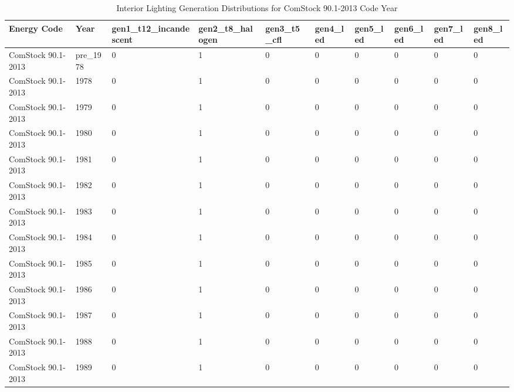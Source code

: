 \begin{table}
\scriptsize
\centering
\caption{Interior Lighting Generation Distributions for ComStock 90.1-2013 Code Year}
\label{tab:ltg_gen_tsv}
\begin{tabular}{|l|l|l|l|l|l|l|l|l|l|}
\hline
\textbf{Energy Code}        & \textbf{Yea}r      & \textbf{gen1\_t12\_incandescent} & \textbf{gen2\_t8\_halogen} & \textbf{gen3\_t5\_cfl} & \textbf{gen4\_led} & \textbf{gen5\_led} & \textbf{gen6\_led} & \textbf{gen7\_led} & \textbf{gen8\_led} \\ \hline
ComStock 90.1-2013 & pre\_1978 & 0 & 1     & 0     & 0         & 0        & 0        & 0        & 0        \\ \hline
ComStock 90.1-2013 & 1978      & 0 & 1     & 0     & 0         & 0        & 0        & 0        & 0        \\ \hline
ComStock 90.1-2013 & 1979      & 0 & 1     & 0     & 0         & 0        & 0        & 0        & 0        \\ \hline
ComStock 90.1-2013 & 1980      & 0 & 1     & 0     & 0         & 0        & 0        & 0        & 0        \\ \hline
ComStock 90.1-2013 & 1981      & 0 & 1     & 0     & 0         & 0        & 0        & 0        & 0        \\ \hline
ComStock 90.1-2013 & 1982      & 0 & 1     & 0     & 0         & 0        & 0        & 0        & 0        \\ \hline
ComStock 90.1-2013 & 1983      & 0 & 1     & 0     & 0         & 0        & 0        & 0        & 0        \\ \hline
ComStock 90.1-2013 & 1984      & 0 & 1     & 0     & 0         & 0        & 0        & 0        & 0        \\ \hline
ComStock 90.1-2013 & 1985      & 0 & 1     & 0     & 0         & 0        & 0        & 0        & 0        \\ \hline
ComStock 90.1-2013 & 1986      & 0 & 1     & 0     & 0         & 0        & 0        & 0        & 0        \\ \hline
ComStock 90.1-2013 & 1987      & 0 & 1     & 0     & 0         & 0        & 0        & 0        & 0        \\ \hline
ComStock 90.1-2013 & 1988      & 0 & 1     & 0     & 0         & 0        & 0        & 0        & 0        \\ \hline
ComStock 90.1-2013 & 1989      & 0 & 1     & 0     & 0         & 0        & 0        & 0        & 0        \\ \hline

\end{tabular}
\end{table}
